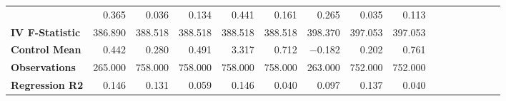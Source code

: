 \begin{tabular}{@{\extracolsep{5pt}}lrrrrrrrrrrrrrrr}
{\bf } & 0.365\phantom{\phantom{)}***} & 0.036\phantom{\phantom{)}***} & 0.134\phantom{\phantom{)}***} & 0.441\phantom{\phantom{)}***} & 0.161\phantom{\phantom{)}***} & 0.265\phantom{\phantom{)}***} & 0.035\phantom{\phantom{)}***} & 0.113\phantom{\phantom{)}***} \\
{\bf IV F-Statistic} & 386.890\phantom{\phantom{)}***} & 388.518\phantom{\phantom{)}***} & 388.518\phantom{\phantom{)}***} & 388.518\phantom{\phantom{)}***} & 388.518\phantom{\phantom{)}***} & 398.370\phantom{\phantom{)}***} & 397.053\phantom{\phantom{)}***} & 397.053\phantom{\phantom{)}***} \\
{\bf Control Mean} & 0.442\phantom{***} & 0.280\phantom{***} & 0.491\phantom{***} & 3.317\phantom{***} & 0.712\phantom{***} & $-$0.182\phantom{***} & 0.202\phantom{***} & 0.761\phantom{***} \\
{\bf Observations} & 265.000\phantom{***} & 758.000\phantom{***} & 758.000\phantom{***} & 758.000\phantom{***} & 758.000\phantom{***} & 263.000\phantom{***} & 752.000\phantom{***} & 752.000\phantom{***} \\
{\bf Regression R2} & 0.146\phantom{***} & 0.131\phantom{***} & 0.059\phantom{***} & 0.146\phantom{***} & 0.040\phantom{***} & 0.097\phantom{***} & 0.137\phantom{***} & 0.040\phantom{***} \\
\hline
\end{tabular}
